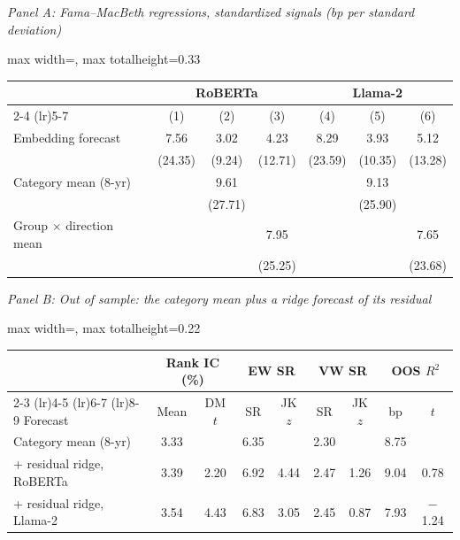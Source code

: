 \begin{table}[htbp]
{\footnotesize
\textit{Panel A: Fama--MacBeth regressions, standardized signals (bp per standard deviation)}\\[2pt]
\begin{adjustbox}{max width=\linewidth, max totalheight=0.33\textheight}
\begin{tabular}{lcccccc}
\toprule
 & \multicolumn{3}{c}{RoBERTa} & \multicolumn{3}{c}{Llama-2} \\
\cmidrule(lr){2-4} \cmidrule(lr){5-7}
 & (1) & (2) & (3) & (4) & (5) & (6) \\
\midrule
Embedding forecast & \phantom{(0}7.56\phantom{)} & \phantom{(0}3.02\phantom{)} & \phantom{(0}4.23\phantom{)} & \phantom{(0}8.29\phantom{)} & \phantom{(0}3.93\phantom{)} & \phantom{(0}5.12\phantom{)} \\
 & (24.35) & \phantom{0}(9.24) & (12.71) & (23.59) & (10.35) & (13.28) \\
Category mean (8-yr) &  & \phantom{(0}9.61\phantom{)} &  &  & \phantom{(0}9.13\phantom{)} &  \\
 &  & (27.71) &  &  & (25.90) &  \\
Group $\times$ direction mean &  &  & \phantom{(0}7.95\phantom{)} &  &  & \phantom{(0}7.65\phantom{)} \\
 &  &  & (25.25) &  &  & (23.68) \\
\bottomrule
\end{tabular}
\end{adjustbox}
\par\medskip
\textit{Panel B: Out of sample: the category mean plus a ridge forecast of its residual}\\[2pt]
\begin{adjustbox}{max width=\linewidth, max totalheight=0.22\textheight}
\begin{tabular}{lcccccccc}
\toprule
 & \multicolumn{2}{c}{Rank IC (\%)} & \multicolumn{2}{c}{EW SR} & \multicolumn{2}{c}{VW SR} & \multicolumn{2}{c}{OOS $R^2$} \\
\cmidrule(lr){2-3} \cmidrule(lr){4-5} \cmidrule(lr){6-7} \cmidrule(lr){8-9}
Forecast & Mean & DM $t$ & SR & JK $z$ & SR & JK $z$ & bp & $t$ \\
\midrule
Category mean (8-yr) & 3.33 &  & 6.35 &  & 2.30 &  & 8.75 &  \\
+ residual ridge, RoBERTa & 3.39 & 2.20 & 6.92 & 4.44 & 2.47 & 1.26 & 9.04 & \phantom{$-$}0.78 \\
+ residual ridge, Llama-2 & 3.54 & 4.43 & 6.83 & 3.05 & 2.45 & 0.87 & 7.93 & $-$1.24 \\
\bottomrule
\end{tabular}
\end{adjustbox}
}
\end{table}
